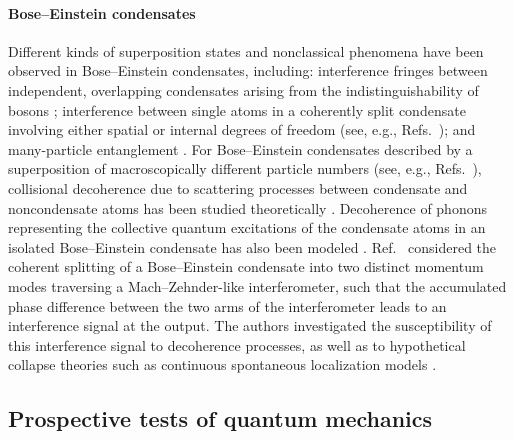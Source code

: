 \documentclass[3p,sort&compress,12pt]{elsarticle}
\begin{document}
\paragraph{Bose--Einstein condensates} Different kinds of superposition states and nonclassical phenomena have been observed in Bose--Einstein condensates, including: interference fringes between independent, overlapping condensates arising from the indistinguishability of bosons \cite{Andrews:1997:um}; interference between single atoms in a coherently split condensate involving either spatial or internal degrees of freedom (see, e.g., Refs.~\cite{Shin:2004:lo,Gross:2010:gg}); and many-particle entanglement \cite{Tura:2014:oo,Schmied:2016:ll,Pezze:2018:uu}. For Bose--Einstein condensates described by a superposition of macroscopically different particle numbers (see, e.g., Refs.~\cite{Cirac:1998:mm,Ruostekoski:1998:mm,Gordon:1999:mh,Dunningham:2001:da,Calsamiglia:2001:tt,Louis:2001:mu,Micheli:2003:jn}), collisional decoherence  due to scattering processes between condensate and noncondensate atoms has been studied theoretically \cite{Dalvit:2000:bb}. Decoherence of phonons representing the collective quantum excitations of the condensate atoms in an isolated Bose--Einstein condensate has also been modeled \cite{Howl:2017:aa}. Ref.~\cite{Schrinski:2017:yy} considered the coherent splitting of a Bose--Einstein condensate into two distinct momentum modes traversing a Mach--Zehnder-like interferometer, such that the accumulated phase difference between the two arms of the interferometer leads to an interference signal at the output. The authors investigated the susceptibility of this interference signal to decoherence processes, as well as to hypothetical collapse theories such as continuous spontaneous localization models \cite{Bassi:2003:yb,Adler:2007:um,Bassi:2010:aa}.


\subsection{\label{sec:exper-tests-quant}Prospective tests of quantum mechanics}
\end{document}

